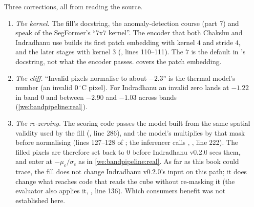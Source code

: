 \begin{sourcenote}
Three corrections, all from reading the source.
\begin{enumerate}
\item \emph{The kernel.} The fill's docstring, the anomaly-detection course (part 7) and
 speak of the SegFormer's ``7x7 kernel''. The encoder that both
Chakshu and Indradhanu use builds its first patch embedding with kernel $4$ and stride $4$, and the
later stages with kernel $3$ (, lines
110--111). The $7$ is the default in 's docstring, not what the
encoder passes.  covers the patch embedding.
\item \emph{The cliff.} ``Invalid pixels normalise to about $-2.3$'' is the thermal model's number
(an invalid $0\,^\circ$C pixel). For Indradhanu an invalid zero lands at $-1.22$ in band $0$ and
between $-2.90$ and $-1.03$ across bands (\cref{we:bandpipeline:real}).
\item \emph{The re-zeroing.} The scoring code passes the model  built from the same
spatial validity used by the fill (, line 286), and the model's
 multiplies by that mask before normalising (lines 127--128 of
; the inferencer calls ,
, line 222). The filled pixels are therefore set back to $0$
before Indradhanu v0.2.0 sees them, and enter at $-\mu_c/\sigma_c$ as in
\cref{we:bandpipeline:real}. As far as this book could trace, the fill does not change Indradhanu
v0.2.0's input on this path; it does change what reaches code that reads the cube without
re-masking it (the evaluator also applies it, , line 136). Which
consumers benefit was not established here.
\end{enumerate}
\end{sourcenote}

